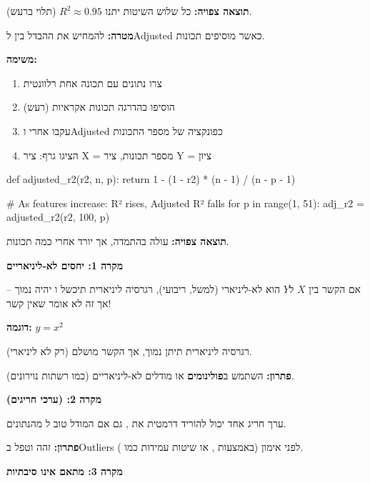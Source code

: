 \textbf{תוצאה צפויה:} כל שלוש השיטות יתנו $R^2 \approx \num{0.95}$ (תלוי ברעש).


\textbf{מטרה:} להמחיש את ההבדל בין \Rsquared{} ל\en{-}Adjusted \Rsquared{} כאשר מוסיפים תכונות.

\textbf{משימה:}

\begin{enumerate}
\item צרו נתונים עם תכונה אחת רלוונטית
\item הוסיפו בהדרגה תכונות אקראיות (רעש)
\item עקבו אחרי \Rsquared{} ו\en{-}Adjusted \Rsquared{} כפונקציה של מספר התכונות
\item הציגו גרף: ציר X = מספר תכונות, ציר Y = ציון
\end{enumerate}

\begin{pythonbox*}
def adjusted_r2(r2, n, p):
    return 1 - (1 - r2) * (n - 1) / (n - p - 1)

# As features increase: R² rises, Adjusted R² falls
for p in range(1, 51):
    adj_r2 = adjusted_r2(r2, 100, p)
\end{pythonbox*}

\textbf{תוצאה צפויה:} \Rsquared{} עולה בהתמדה, אך  יורד אחרי כמה תכונות.


\textbf{מקרה \num{1}: יחסים לא-ליניאריים}

אם הקשר בין $X$ ל\en{-}$Y$ הוא לא-ליניארי (למשל, ריבועי), רגרסיה ליניארית תיכשל ו\en{-}\Rsquared{} יהיה נמוך – אך זה לא אומר שאין קשר!

\textbf{דוגמה:} $y = x^2$

רגרסיה ליניארית תיתן \Rsquared{} נמוך, אך הקשר מושלם (רק לא ליניארי).

\textbf{פתרון:} השתמש ב\textbf{פולינומים} או מודלים לא-ליניאריים (כמו רשתות נוירונים).

\textbf{מקרה \num{2}:  (ערכי חריגים)}

ערך חריג אחד יכול להוריד דרמטית את \Rsquared{}, גם אם המודל טוב ל\en{-} מהנתונים.

\textbf{פתרון:} זהה וטפל ב\en{-}Outliers לפני אימון (באמצעות , או שיטות עמידות כמו ).

\textbf{מקרה \num{3}: מתאם אינו סיבתיות}

